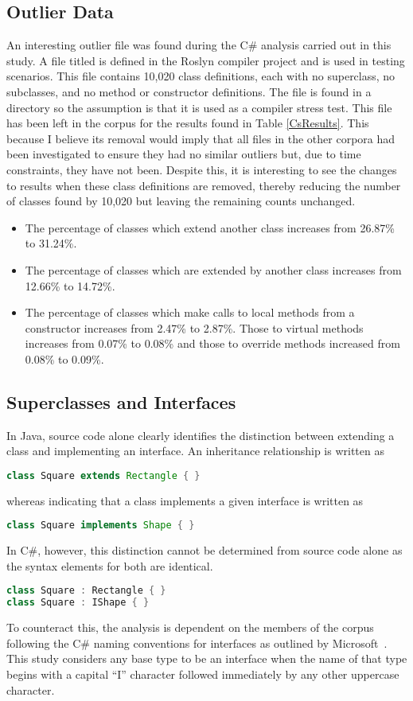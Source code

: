\subsection{Outlier Data}
An interesting outlier file was found during the C\# analysis carried out in this study. A file titled  is defined in the Roslyn compiler project and is used in testing scenarios. This file contains 10,020 class definitions, each with no superclass, no subclasses, and no method or constructor definitions. The file is found in a  directory so the assumption is that it is used as a compiler stress test. This file has been left in the corpus for the results found in Table \ref{CsResults}. This because I believe its removal would imply that all files in the other corpora had been investigated to ensure they had no similar outliers but, due to time constraints, they have not been. Despite this, it is interesting to see the changes to results when these class definitions are removed, thereby reducing the number of classes found by 10,020 but leaving the remaining counts unchanged.
\begin{itemize}
	\item The percentage of classes which extend another class increases from 26.87\% to 31.24\%.
	\item The percentage of classes which are extended by another class increases from 12.66\% to 14.72\%.
	\item The percentage of classes which make calls to local methods from a constructor increases from 2.47\% to 2.87\%. Those to virtual methods increases from 0.07\% to 0.08\% and those to override methods increased from 0.08\% to 0.09\%.
\end{itemize}

\subsection{Superclasses and Interfaces}
\label{interfaceNaming}
In Java, source code alone clearly identifies the distinction between extending a class and implementing an interface. An inheritance relationship is written as
\begin{lstlisting}[language=java]
class Square extends Rectangle { }
\end{lstlisting}
whereas indicating that a class implements a given interface is written as
\begin{lstlisting}[language=java]
class Square implements Shape { }
\end{lstlisting}
In C\#, however, this distinction cannot be determined from source code alone as the syntax elements for both are identical.
\begin{lstlisting}[language=cs]
class Square : Rectangle { }
class Square : IShape { }
\end{lstlisting}
To counteract this, the analysis is dependent on the members of the corpus following the C\# naming conventions for interfaces as outlined by Microsoft~\cite{InterfaceNaming}. This study considers any base type to be an interface when the name of that type begins with a capital ``I'' character followed immediately by any other uppercase character.

